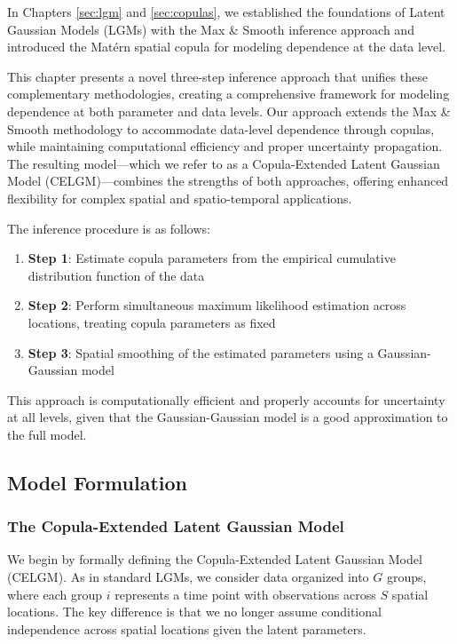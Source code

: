 
In Chapters \ref{sec:lgm} and \ref{sec:copulas}, we established the foundations of Latent Gaussian Models (LGMs) with the Max \& Smooth inference approach and introduced the Matérn spatial copula for modeling dependence at the data level.

This chapter presents a novel three-step inference approach that unifies these complementary methodologies, creating a comprehensive framework for modeling dependence at both parameter and data levels. Our approach extends the Max \& Smooth methodology to accommodate data-level dependence through copulas, while maintaining computational efficiency and proper uncertainty propagation. The resulting model---which we refer to as a Copula-Extended Latent Gaussian Model (CELGM)---combines the strengths of both approaches, offering enhanced flexibility for complex spatial and spatio-temporal applications.

The inference procedure is as follows:
\begin{enumerate}
    \item \textbf{Step 1}: Estimate copula parameters from the empirical cumulative distribution function of the data
    \item \textbf{Step 2}: Perform simultaneous maximum likelihood estimation across locations, treating copula parameters as fixed
    \item \textbf{Step 3}: Spatial smoothing of the estimated parameters using a Gaussian-Gaussian model
\end{enumerate}

This approach is computationally efficient and properly accounts for uncertainty at all levels, given that the Gaussian-Gaussian model is a good approximation to the full model.

\subsection{Model Formulation}

\subsubsection{The Copula-Extended Latent Gaussian Model}
We begin by formally defining the Copula-Extended Latent Gaussian Model (CELGM). As in standard LGMs, we consider data organized into $G$ groups, where each group $i$ represents a time point with observations across $S$ spatial locations. The key difference is that we no longer assume conditional independence across spatial locations given the latent parameters.

